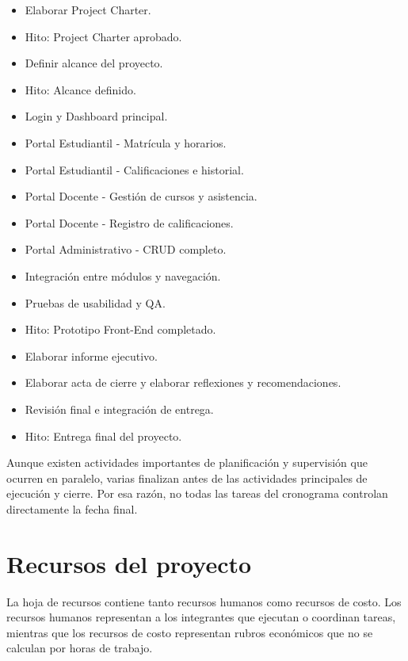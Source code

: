 \documentclass[11pt,spanish]{article}
\begin{document}
\begin{itemize}[leftmargin=*, label={\textbullet}]
    \item Elaborar Project Charter.
    \item Hito: Project Charter aprobado.
    \item Definir alcance del proyecto.
    \item Hito: Alcance definido.
    \item Login y Dashboard principal.
    \item Portal Estudiantil - Matrícula y horarios.
    \item Portal Estudiantil - Calificaciones e historial.
    \item Portal Docente - Gestión de cursos y asistencia.
    \item Portal Docente - Registro de calificaciones.
    \item Portal Administrativo - CRUD completo.
    \item Integración entre módulos y navegación.
    \item Pruebas de usabilidad y QA.
    \item Hito: Prototipo Front-End completado.
    \item Elaborar informe ejecutivo.
    \item Elaborar acta de cierre y elaborar reflexiones y recomendaciones.
    \item Revisión final e integración de entrega.
    \item Hito: Entrega final del proyecto.
\end{itemize}

Aunque existen actividades importantes de planificación y supervisión que ocurren en paralelo, varias finalizan antes de las actividades principales de ejecución y cierre. Por esa razón, no todas las tareas del cronograma controlan directamente la fecha final.

\section{Recursos del proyecto}

La hoja de recursos contiene tanto recursos humanos como recursos de costo. Los recursos humanos representan a los integrantes que ejecutan o coordinan tareas, mientras que los recursos de costo representan rubros económicos que no se calculan por horas de trabajo.
\end{document}
